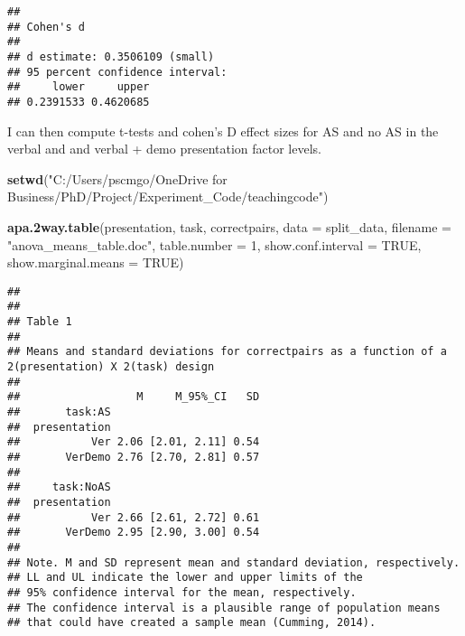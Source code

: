 \documentclass[]{article}
\newenvironment{Shaded}{\begin{snugshade}}{\end{snugshade}}
\newcommand{\KeywordTok}[1]{\textcolor[rgb]{0.13,0.29,0.53}{\textbf{#1}}}
\newcommand{\DataTypeTok}[1]{\textcolor[rgb]{0.13,0.29,0.53}{#1}}
\newcommand{\DecValTok}[1]{\textcolor[rgb]{0.00,0.00,0.81}{#1}}
\newcommand{\StringTok}[1]{\textcolor[rgb]{0.31,0.60,0.02}{#1}}
\newcommand{\OtherTok}[1]{\textcolor[rgb]{0.56,0.35,0.01}{#1}}
\newcommand{\OperatorTok}[1]{\textcolor[rgb]{0.81,0.36,0.00}{\textbf{#1}}}
\newcommand{\NormalTok}[1]{#1}
\begin{document}
\begin{Shaded}
\end{Shaded}

\begin{verbatim}
## 
## Cohen's d
## 
## d estimate: 0.3506109 (small)
## 95 percent confidence interval:
##     lower     upper 
## 0.2391533 0.4620685
\end{verbatim}

I can then compute t-tests and cohen's D effect sizes for AS and no AS
in the verbal and and verbal + demo presentation factor levels.

\begin{Shaded}
\begin{Highlighting}[]
\KeywordTok{setwd}\NormalTok{(}\StringTok{"C:/Users/pscmgo/OneDrive for Business/PhD/Project/Experiment_Code/teachingcode"}\NormalTok{)}

\KeywordTok{apa.2way.table}\NormalTok{(presentation, task, correctpairs, }\DataTypeTok{data =}\NormalTok{ split_data, }\DataTypeTok{filename =} \StringTok{"anova_means_table.doc"}\NormalTok{, }\DataTypeTok{table.number =} \DecValTok{1}\NormalTok{,}
  \DataTypeTok{show.conf.interval =} \OtherTok{TRUE}\NormalTok{, }\DataTypeTok{show.marginal.means =} \OtherTok{TRUE}\NormalTok{)}
\end{Highlighting}
\end{Shaded}

\begin{verbatim}
## 
## 
## Table 1 
## 
## Means and standard deviations for correctpairs as a function of a 2(presentation) X 2(task) design 
## 
##                  M     M_95%_CI   SD
##       task:AS                       
##  presentation                       
##           Ver 2.06 [2.01, 2.11] 0.54
##       VerDemo 2.76 [2.70, 2.81] 0.57
##                                     
##     task:NoAS                       
##  presentation                       
##           Ver 2.66 [2.61, 2.72] 0.61
##       VerDemo 2.95 [2.90, 3.00] 0.54
## 
## Note. M and SD represent mean and standard deviation, respectively. 
## LL and UL indicate the lower and upper limits of the 
## 95% confidence interval for the mean, respectively. 
## The confidence interval is a plausible range of population means 
## that could have created a sample mean (Cumming, 2014).
\end{verbatim}
\end{document}
